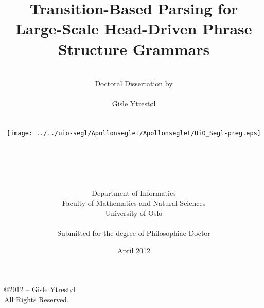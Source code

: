 \documentclass[11pt,a4paper,openright,twoside]{report}
\title{\Huge{Transition-Based Parsing for Large-Scale Head-Driven Phrase Structure Grammars}}
\author{\\
Doctoral Dissertation by\\
\\
\Large{Gisle Ytrest\o l} \\
\\
\\
 \texttt{[image: ../../uio-segl/Apollonseglet/Apollonseglet/UiO\_Segl-preg.eps]}
\\
\\
\\
\\
\\
\\
 Department of Informatics\\
Faculty of Mathematics and Natural Sciences\\
University of Oslo\\
\\
Submitted for the degree of Philosophiae Doctor}
\date{April 2012}
\begin{document}
\noitemsep





\pagestyle{empty}
\begin{titlepage}



\maketitle



 
\end{titlepage}


\null
\vfill
\begin{center}
    \copyright 2012 -- Gisle Ytrest\o l\\
    All Rights Reserved.
\end{center}

\end{document}
